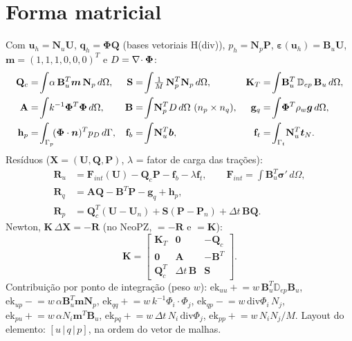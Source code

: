 \documentclass[11pt,a4paper]{article}
\newcommand{\cc}[1]{\texttt{\detokenize{#1}}}
\newcommand{\bu}{\boldsymbol{u}}\newcommand{\bq}{\boldsymbol{q}}\newcommand{\bv}{\boldsymbol{v}}
\newcommand{\bg}{\boldsymbol{g}}\newcommand{\bt}{\boldsymbol{t}}\newcommand{\bsig}{\boldsymbol{\sigma}}
\newcommand{\beps}{\boldsymbol{\varepsilon}}\newcommand{\mvec}{\boldsymbol{m}}
\newcommand{\Kt}{\mathbf{K}_T}\newcommand{\Qc}{\mathbf{Q}_c}
\begin{document}
\section{Forma matricial}
Com $\bu_h=\mathbf N_u\mathbf U$, $\bq_h=\boldsymbol\Phi\mathbf Q$ (bases vetoriais H(div)), $p_h=\mathbf N_p\mathbf P$,
$\beps(\bu_h)=\mathbf B_u\mathbf U$, $\mvec=(1,1,1,0,0,0)^T$ e $D=\nabla\!\cdot\boldsymbol\Phi$:
\begin{align}
 \Qc&=\!\int\!\alpha\,\mathbf B_u^T\mvec\,\mathbf N_p\,d\Omega, &
 \mathbf S&=\!\int\!\tfrac1M\,\mathbf N_p^T\mathbf N_p\,d\Omega, &
 \Kt&=\!\int\!\mathbf B_u^T\,\mathbb D_{ep}\,\mathbf B_u\,d\Omega,\\
 \mathbf A&=\!\int\!k^{-1}\boldsymbol\Phi^T\boldsymbol\Phi\,d\Omega, &
 \mathbf B&=\!\int\!\mathbf N_p^T D\,d\Omega\ (n_p\times n_q), &
 \mathbf g_q&=\!\int\!\boldsymbol\Phi^T\rho_w\bg\,d\Omega,\\
 \mathbf h_p&=\!\int_{\Gamma_p}\!(\boldsymbol\Phi\cdot\bn)^Tp_D\,d\Gamma, &
 \mathbf f_b&=\!\int\!\mathbf N_u^T\bb, & \mathbf f_t&=\!\int_{\Gamma_t}\!\mathbf N_u^T\bt_N .
\end{align}
Resíduos ($\mathbf X=(\mathbf U,\mathbf Q,\mathbf P)$, $\lambda$ = fator de carga das trações):
\begin{align}
 \mathbf R_u&=\mathbf F_{int}(\mathbf U)-\Qc\mathbf P-\mathbf f_b-\lambda\mathbf f_t, \qquad \mathbf F_{int}=\!\int\!\mathbf B_u^T\bsig'\,d\Omega,\\
 \mathbf R_q&=\mathbf A\mathbf Q-\mathbf B^T\mathbf P-\mathbf g_q+\mathbf h_p,\\
 \mathbf R_p&=\Qc^T(\mathbf U-\mathbf U_n)+\mathbf S(\mathbf P-\mathbf P_n)+\Delta t\,\mathbf B\mathbf Q .
\end{align}
Newton, $\mathbf K\,\Delta\mathbf X=-\mathbf R$ (no NeoPZ, \cc{ef}$=-\mathbf R$ e \cc{ek}$=\mathbf K$):
\begin{equation}\label{eq:K}
 \mathbf K=\begin{bmatrix}
 \Kt & \mathbf 0 & -\Qc\\
 \mathbf 0 & \mathbf A & -\mathbf B^T\\
 \Qc^T & \Delta t\,\mathbf B & \mathbf S
 \end{bmatrix}.
\end{equation}
Contribuição por ponto de integração (peso $w$): $\mathrm{ek}_{uu}\mathrel{+}=w\,\mathbf B_u^T\mathbb D_{ep}\mathbf B_u$,
$\mathrm{ek}_{up}\mathrel{-}=w\,\alpha\mathbf B_u^T\mvec\mathbf N_p$, $\mathrm{ek}_{qq}\mathrel{+}=w\,k^{-1}\Phi_i\!\cdot\!\Phi_j$,
$\mathrm{ek}_{qp}\mathrel{-}=w\,\mathrm{div}\Phi_i\,N_j$, $\mathrm{ek}_{pu}\mathrel{+}=w\,\alpha N_i\mvec^T\mathbf B_u$,
$\mathrm{ek}_{pq}\mathrel{+}=w\,\Delta t\,N_i\,\mathrm{div}\Phi_j$, $\mathrm{ek}_{pp}\mathrel{+}=w\,N_iN_j/M$.
Layout do elemento: $[u\,|\,q\,|\,p]$, na ordem do vetor de malhas.
\end{document}

